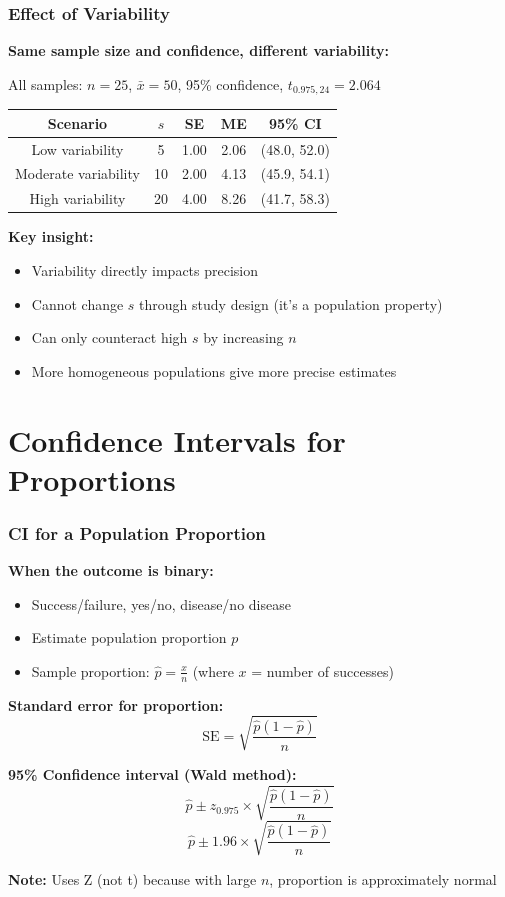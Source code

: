 \documentclass{beamer}
\begin{document}
\begin{frame}
\frametitle{Effect of Variability}
\textbf{Same sample size and confidence, different variability:}

\vspace{0.3cm}
All samples: $n = 25$, $\bar{x} = 50$, 95\% confidence, $t_{0.975, 24} = 2.064$

\vspace{0.3cm}
\begin{center}
\begin{tabular}{ccccc}
\toprule
Scenario & $s$ & SE & ME & 95\% CI \\
\midrule
Low variability & 5 & 1.00 & 2.06 & (48.0, 52.0) \\
Moderate variability & 10 & 2.00 & 4.13 & (45.9, 54.1) \\
High variability & 20 & 4.00 & 8.26 & (41.7, 58.3) \\
\bottomrule
\end{tabular}
\end{center}

\vspace{0.5cm}
\textbf{Key insight:}
\begin{itemize}
\item Variability directly impacts precision
\item Cannot change $s$ through study design (it's a population property)
\item Can only counteract high $s$ by increasing $n$
\item More homogeneous populations give more precise estimates
\end{itemize}
\end{frame}

\section{Confidence Intervals for Proportions}

\begin{frame}
\frametitle{CI for a Population Proportion}
\textbf{When the outcome is binary:}
\begin{itemize}
\item Success/failure, yes/no, disease/no disease
\item Estimate population proportion $p$
\item Sample proportion: $\hat{p} = \frac{x}{n}$ (where $x$ = number of successes)
\end{itemize}

\vspace{0.5cm}
\textbf{Standard error for proportion:}
$$\text{SE} = \sqrt{\frac{\hat{p}(1-\hat{p})}{n}}$$

\vspace{0.5cm}
\textbf{95\% Confidence interval (Wald method):}
$$\hat{p} \pm z_{0.975} \times \sqrt{\frac{\hat{p}(1-\hat{p})}{n}}$$
$$\hat{p} \pm 1.96 \times \sqrt{\frac{\hat{p}(1-\hat{p})}{n}}$$

\vspace{0.3cm}
\textbf{Note:} Uses Z (not t) because with large $n$, proportion is approximately normal
\end{frame}
\end{document}

